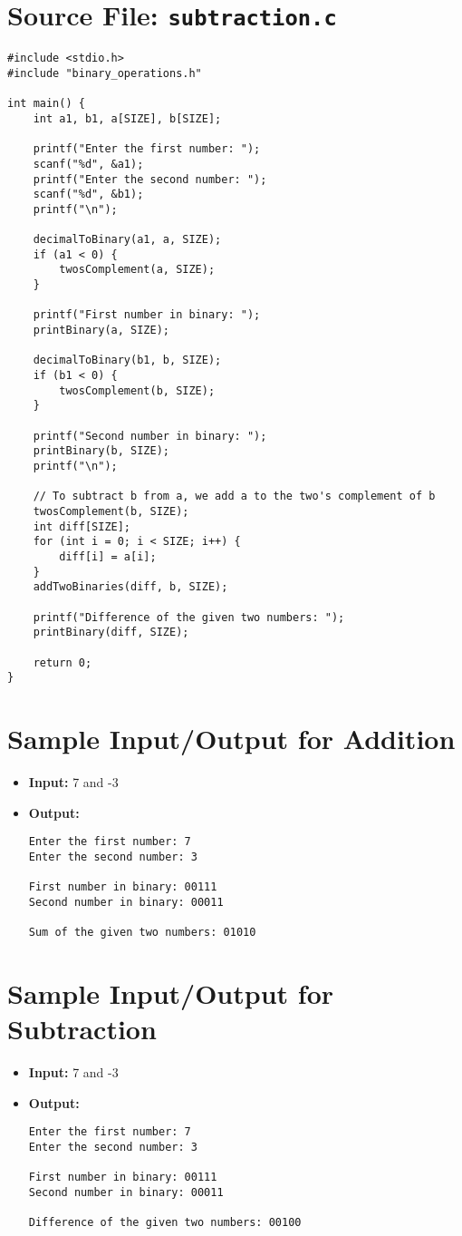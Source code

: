 \documentclass[a4paper,12pt]{article}
\begin{document}
\section*{Source File: \texttt{subtraction.c}}

\begin{verbatim}
#include <stdio.h>
#include "binary_operations.h"

int main() {
    int a1, b1, a[SIZE], b[SIZE];

    printf("Enter the first number: ");
    scanf("%d", &a1);
    printf("Enter the second number: ");
    scanf("%d", &b1);
    printf("\n");

    decimalToBinary(a1, a, SIZE);
    if (a1 < 0) {
        twosComplement(a, SIZE);
    }

    printf("First number in binary: ");
    printBinary(a, SIZE);

    decimalToBinary(b1, b, SIZE);
    if (b1 < 0) {
        twosComplement(b, SIZE);
    }

    printf("Second number in binary: ");
    printBinary(b, SIZE);
    printf("\n");

    // To subtract b from a, we add a to the two's complement of b
    twosComplement(b, SIZE);
    int diff[SIZE];
    for (int i = 0; i < SIZE; i++) {
        diff[i] = a[i];
    }
    addTwoBinaries(diff, b, SIZE);

    printf("Difference of the given two numbers: ");
    printBinary(diff, SIZE);

    return 0;
}
\end{verbatim}

\section*{Sample Input/Output for Addition}
\begin{itemize}
    \item \textbf{Input:} 7 and -3
    \item \textbf{Output:}
    \begin{verbatim}
Enter the first number: 7
Enter the second number: 3

First number in binary: 00111
Second number in binary: 00011

Sum of the given two numbers: 01010
    \end{verbatim}
\end{itemize}

\section*{Sample Input/Output for Subtraction}
\begin{itemize}
    \item \textbf{Input:} 7 and -3
    \item \textbf{Output:}
    \begin{verbatim}
Enter the first number: 7
Enter the second number: 3

First number in binary: 00111
Second number in binary: 00011

Difference of the given two numbers: 00100
    \end{verbatim}
\end{itemize}
\end{document}
